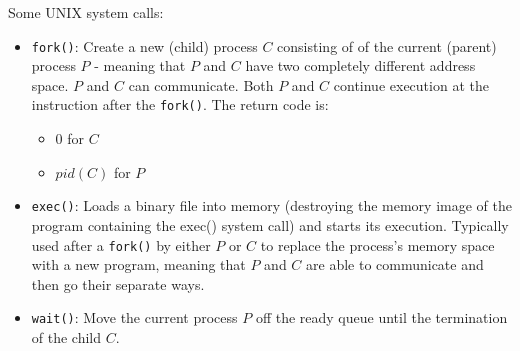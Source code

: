     \par Some UNIX system calls:
    \begin{itemize}
      \item \lstinline{fork()}: Create a new (child) process $C$ consisting of  of the current (parent) process $P$ - meaning that $P$ and $C$ have two completely different address space. $P$ and $C$ can communicate. Both $P$ and $C$ continue execution at the instruction after the \lstinline{fork()}. The return code is:
        \begin{itemize}
          \item 0 for $C$
          \item $pid(C)$ for $P$
        \end{itemize}
      \item \lstinline{exec()}: Loads a binary file into memory (destroying the memory image of the program containing the exec() system call) and starts its execution. Typically used after a \lstinline{fork()} by either $P$ or $C$ to replace the process's memory space with a new program, meaning that $P$ and $C$ are able to communicate and then go their separate ways.
      \item \lstinline{wait()}: Move the current process $P$ off the ready queue until the termination of the child $C$.
    \end{itemize}

